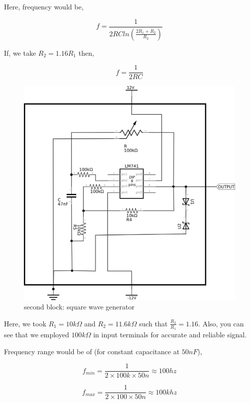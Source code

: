 \documentclass{article}
\begin{document}
Here, frequency would be, 

\begin{equation}
\label{eq:orgb7398be}
  f =\frac{1}{2 RC ln(\frac{2R_{1}+R_{2}}{R_{2}})}
\end{equation}

If, we take \(R_{2}=1.16R_{1}\) then, 

\begin{equation}
\label{eq:org63bb2b5}
  f =\frac{1}{2RC}
\end{equation}

\begin{figure}[htbp]
\centering
\includegraphics[width=0.8 \textwidth]{imgs/squarereal.png}
\caption{\label{fig:org83cdf94}second block: square wave generator}
\end{figure}

Here, we took \(R_{1} = 10k\Omega\) and \(R_{2} = 11.6k\Omega\) such that \(\frac{R_{2}}{R_{1}}=1.16\). Also, you can see that we employed \(100k\Omega\) in input terminals for accurate and reliable signal.

Frequency range would be of (for constant capacitance at \(50nF\)),

\begin{equation*}
\label{eq:orgfc248e4}
  f_{min} =\frac{1}{2\times 100k\times 50n} \approx 100 hz
\end{equation*}

\begin{equation*}
\label{eq:org3c26fb0}
  f_{max} =\frac{1}{2\times 100 \times 50n} \approx 100 khz
\end{equation*}
\end{document}
